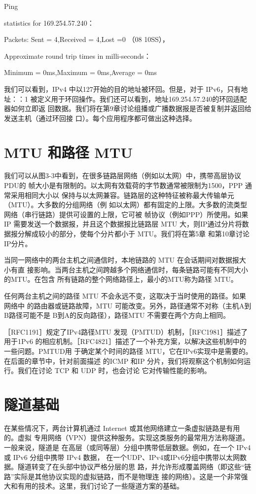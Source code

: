 Ping

statistics for 169.254.57.240：

Packets: Sent = 4,Received = 4,Lost =0 （08 10SS），

Approximate round trip times in milli-seconds：

Minimum = 0ms,Maximum = 0ms,Average = 0ms

我们可以看到，IPv4 中以127开始的目的地址被环回。但是，对于 IPv6，只有地址：：1
被定义用于环回操作。我们还可以看到，地址169.254.57.240的环回适配器如何立即返
回数据。我们将在第9章讨论组播或广播数据报是否被复制并返回给发送主机（通过环回接
口）。每个应用程序都可做出这种选择。

\section{MTU 和路径 MTU}

我们可以从图3-3中看到，在很多链路层网络（例如以太网）中，携带高层协议 PDU的
帧大小是有限制的。以太网有效载荷的字节数通常被限制为1500，PPP 通常采用相同大小以
保持与以太网兼容。链路层的这种特征被称最大传输单元（MTU）。大多数的分组网络（例
如以太网）都有固定的上限。大多数的流类型网络（串行链路）提供可设置的上限，它可被
帧协议（例如PPP）所使用。如果IP 需要发送一个数据报，并且这个数据报比链路层 MTU
大，则IP通过分片将数据报分解成较小的部分，使每个分片都小于 MTU。我们将在第5章
和第10章讨论IP分片。

当同一网络中的两台主机之间通信时，本地链路的 MTU 在会话期间对数据报大小有直
接影响。当两台主机之间跨越多个网络通信时，每条链路可能有不同大小的MTU。在包含
所有链路的整个网络路径上，最小的MTU称为路径 MTU。

任何两台主机之间的路径 MTU 不会永远不变，这取决于当时使用的路径。如果网络中
的路由器或链路故障，MTU 可能改变。另外，路径通常不对称（主机A到B路径可能不是
B到A的反向路径），路径MTU 不需要在两个方向上相同。

［RFC1191］规定了IPv4路径MTU 发现（PMTUD）机制，［RFC1981］描述了用于1Pv6
的相应机制。［RFC4821］描述了一个补充方案，以解决这些机制中的一些问题。PMTUD用
于确定某个时间的路径 MTU，它在IPv6实现中是需要的。在后面的章节中，针对前面描述
的ICMP 和IP 分片，我们将观察这个机制如何运行。我们在讨论 TCP 和 UDP 时，也会讨论
它对传输性能的影响。

\section{隧道基础}

在某些情况下，两台计算机通过 Internet 或其他网络建立一条虚拟链路是有用的。虚拟
专用网络（VPN）提供这种服务。实现这类服务的最常用方法称隧道。一般来说，隧道是
在高层（或同等层）分组中携带低层数据。例如，在一个 IPv4或 IPv6 分组中携带 IPv4 数据，
在一个UDP、IPv4或IPv6分组中携带以太网数据。隧道转变了在头部中协议严格分层的思
路，并允许形成覆盖网络（即这些“链路”实际是其他协议实现的虚拟链路，而不是物理连
接的网络）。这是一个非常强大和有用的技术。这里，我们讨论了一些隧道方案的基础。

